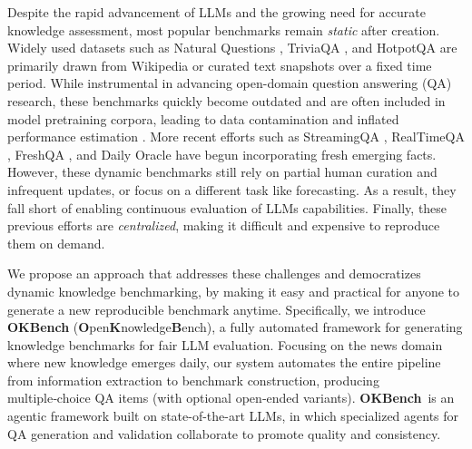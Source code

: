 \documentclass[11pt]{article}
\newcommand{\name}{{\textbf{OKBench}}}
\begin{document}
Despite the rapid advancement of LLMs and the growing need for accurate knowledge assessment, most popular benchmarks remain \emph{static} after creation. 
Widely used datasets such as Natural Questions \citep{kwiatkowski-etal-2019-natural}, TriviaQA \citep{joshi-etal-2017-triviaqa}, and HotpotQA \citep{yang-etal-2018-hotpotqa} are primarily drawn from Wikipedia or curated text snapshots over a fixed time period. 
While instrumental in advancing open-domain question answering (QA) research, these benchmarks quickly become outdated and are often included in model pretraining corpora, leading to data contamination and inflated performance estimation \citep{li-etal-2024-open-source}. 
More recent efforts such as StreamingQA \citep{liška2022streamingqabenchmarkadaptationnew}, RealTimeQA \citep{kasai2024realtimeqawhatsanswer}, FreshQA \citep{vu-etal-2024-freshllms}, and Daily Oracle \citep{dai2024llmsprescientcontinuousevaluation} have begun incorporating fresh emerging facts. However, these dynamic benchmarks still rely on partial human curation and infrequent updates, or focus on a different task like forecasting. 
As a result, they fall short of enabling continuous evaluation of LLMs capabilities.
Finally, these previous efforts are \textit {centralized}, making it difficult and expensive to reproduce them on demand.

We propose an approach that addresses these challenges and democratizes dynamic knowledge benchmarking, by making it easy and practical for anyone to generate a new reproducible benchmark anytime. Specifically, we introduce \textbf{{\name}} (\textbf{O}pen\textbf{K}nowledge\textbf{B}ench), a fully automated framework for generating knowledge benchmarks for fair LLM evaluation. 
Focusing on the news domain where new knowledge emerges daily, our system automates the entire pipeline from information extraction to benchmark construction, producing multiple‑choice QA items (with optional open‑ended variants). 
\name~is an agentic framework built on state-of-the-art LLMs, in which specialized agents for QA generation and validation collaborate to promote quality and consistency. 
\end{document}
